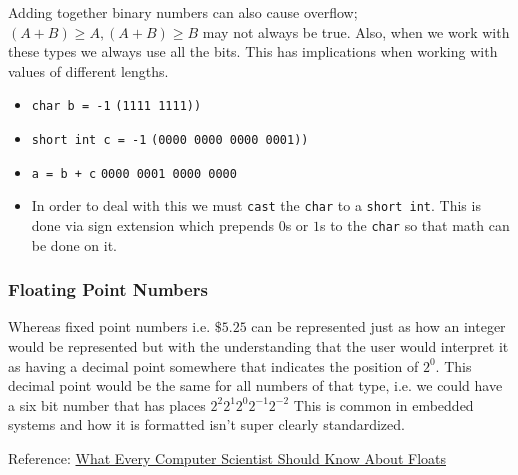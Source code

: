 \documentclass[../notes.tex]{subfiles}
\begin{document}
Adding together binary numbers can also cause overflow; $ (A+B) \ge A, (A+B) \ge  B $ may not always be true.
Also, when we work with these types we always use all the bits. This has implications when working with values of different lengths.

\begin{itemize}
	\item \texttt{char b = -1}  \texttt{(1111 1111))}
	\item \texttt{short int c = -1}  \texttt{(0000 0000 0000 0001))}
	\item \texttt{a = b + c} \texttt{0000 0001 0000 0000 } 
	\item In order to deal with this we must \texttt{cast} the \texttt{char} to a \texttt{short int}. This is done via sign extension which prepends $ 0 $s or $ 1 $s  to the \texttt{char} so that math can be done on it.
\end{itemize}


\subsubsection{Floating Point Numbers}


Whereas fixed point numbers i.e. $ \$5.25 $ can be represented just as how an integer would be represented but with the understanding that the user would interpret it as having a decimal point somewhere that indicates the position of $ 2^0 $.
This decimal point would be the same for all numbers of that type, i.e. we could have a six bit number that has places $ 2^2 2^1 2^0 2^{-1} 2^{-2} $ 
This is common in embedded systems and how it is formatted isn't super clearly standardized.

\begin{lemma}
	Reference: \href{https://www.eecg.utoronto.ca/~moshovos/ECE352-2022/00.practice/What\%20Every\%20Computer\%20Scientist\%20Should\%20Know\%20About\%20Floating-Point\%20Arithmetic.htm}{What Every Computer Scientist Should Know About Floats}
\end{lemma}
\end{document}
